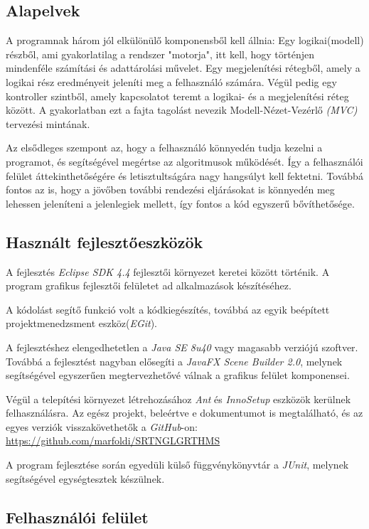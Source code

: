\documentclass{elteikthesis}
\begin{document}
\subsection{Alapelvek}
A programnak három jól elkülönülő komponensből kell állnia:
Egy logikai(modell) részből, ami gyakorlatilag a rendszer "motorja", itt kell, hogy történjen mindenféle számítási és adattárolási művelet. Egy megjelenítési rétegből, amely a logikai rész eredményeit jeleníti meg a felhasználó számára. Végül pedig egy kontroller szintből, amely kapcsolatot teremt a logikai- és a megjelenítési réteg között. A gyakorlatban ezt a fajta tagolást nevezik Modell-Nézet-Vezérlő \emph{(MVC)} tervezési mintának.\par
Az elsődleges szempont az, hogy a felhasználó könnyedén tudja kezelni a programot, és segítségével megértse az algoritmusok működését. Így a felhasználói felület áttekinthetőségére és letisztultságára nagy hangsúlyt kell fektetni. Továbbá fontos az is, hogy a jövőben további rendezési eljárásokat is könnyedén meg lehessen jeleníteni a jelenlegiek mellett, így fontos a kód egyszerű bővíthetősége.

\subsection{Használt fejlesztőeszközök}
A fejlesztés \emph{Eclipse SDK 4.4} fejlesztői környezet keretei között történik. A program grafikus fejlesztői felületet ad alkalmazások készítéséhez.\par
A kódolást segítő funkció volt a kódkiegészítés, továbbá az egyik beépített projektmenedzsment eszköz(\emph{EGit}).\par
A fejlesztéshez elengedhetetlen a \emph{Java SE 8u40} vagy magasabb verziójú szoftver. Továbbá a fejlesztést nagyban elősegíti a \emph{JavaFX Scene Builder 2.0}, melynek segítségével egyszerűen megtervezhetővé válnak a grafikus felület komponensei.\par
Végül a telepítési környezet létrehozásához \emph{Ant} és \emph{InnoSetup} eszközök kerülnek felhasználásra.
Az egész projekt, beleértve e dokumentumot is megtalálható, és az egyes verziók visszakövethetők a \emph{GitHub}-on: \url{https://github.com/marfoldi/SRTNGLGRTHMS}\par
A program fejlesztése során egyedüli külső függvénykönyvtár a \emph{JUnit}, melynek segítségével egységtesztek készülnek.

\subsection{Felhasználói felület}
\end{document}
